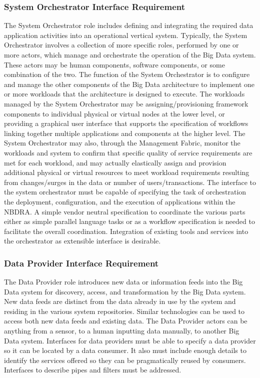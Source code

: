 \documentclass[10pt]{article}
\begin{document}
\subsubsection{System Orchestrator Interface Requirement}\label{S:r-orchestrator}

The System Orchestrator role includes defining and integrating the
required data application activities into an operational vertical
system. Typically, the System Orchestrator involves a collection of
more specific roles, performed by one or more actors, which manage and
orchestrate the operation of the Big Data system. These actors may be
human components, software components, or some combination of the two.
The function of the System Orchestrator is to configure and manage the
other components of the Big Data architecture to implement one or more
workloads that the architecture is designed to execute. The workloads
managed by the System Orchestrator may be assigning/provisioning
framework components to individual physical or virtual nodes at the
lower level, or providing a graphical user interface that supports the
specification of workflows linking together multiple applications and
components at the higher level. The System Orchestrator may also,
through the Management Fabric, monitor the workloads and system to
confirm that specific quality of service requirements are met for each
workload, and may actually elastically assign and provision additional
physical or virtual resources to meet workload requirements resulting
from changes/surges in the data or number of users/transactions. The
interface to the system orchestrator must be capable of specifying the
task of orchestration the deployment, configuration, and the execution
of applications within the NBDRA. A simple vendor neutral
specification to coordinate the various parts either as simple
parallel language tasks or as a workflow specification is needed to
facilitate the overall coordination. Integration of existing tools and
services into the orchestrator as extensible interface is desirable.

\subsubsection{Data Provider Interface Requirement}\label{S:r-provider}

The Data Provider role introduces new data or information feeds into
the Big Data system for discovery, access, and transformation by the
Big Data system. New data feeds are distinct from the data already in
use by the system and residing in the various system repositories.
Similar technologies can be used to access both new data feeds and
existing data. The Data Provider actors can be anything from a sensor,
to a human inputting data manually, to another Big Data system.
Interfaces for data providers must be able to specify a data provider
so it can be located by a data consumer. It also must include enough
details to identify the services offered so they can be pragmatically
reused by consumers. Interfaces to describe pipes and filters must be
addressed.
\end{document}
